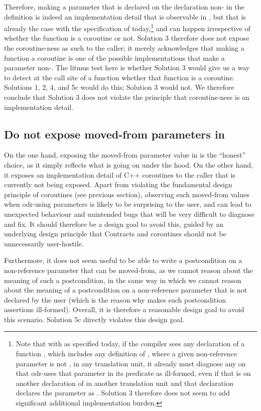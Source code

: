 Therefore, making a parameter that is declared  on the declaration non- in the definition is indeed an implementation detail that is observable in , but that is already the case with the specification of \cite{P2900R8} today,\footnote{Note that with \cite{P2900R8} as specified today, if the compiler sees any declaration of a function , which includes any definition of , where a given non-reference parameter is not , in any translation unit, it already must diagnose any  on  that odr-uses that parameter in its predicate as ill-formed, even if that  is on another declaration of  in another translation unit and that declaration declares the parameter as . Solution 3 therefore does not seem to add significant additional implementation burden.} and can happen irrespective of whether the function is a coroutine or not. Solution 3 therefore does not expose the coroutine-ness as such to the caller; it merely acknowledges that making a function a coroutine is one of the possible implementations that make a parameter non-. The litmus test here is whether Solution 3 would give us a way to detect at the call site of a function whether that function is a coroutine. Solutions 1, 2, 4, and 5c would do this; Solution 3 would not. We therefore conclude that Solution 3 does not violate the principle that coroutine-ness is an implementation detail.

\subsection{Do not expose moved-from parameters in }

On the one hand, exposing the moved-from parameter value in  is the ``honest'' choice, as it simply reflects what is going on under the hood. On the other hand, it exposes an implementation detail of C++ coroutines to the caller that is currently not being exposed. Apart from violating the fundamental design principle of coroutines (see previous section), observing such moved-from values when odr-using  parameters is likely to be surprising to the user, and can lead to unexpected behaviour and unintended bugs that will be very difficult to diagnose and fix. It should therefore be a design goal to avoid this, guided by an underlying design principle that Contracts and coroutines should not be unnecessarily user-hostile.

Furthermore, it does not seem useful to be able to write a postcondition on a non-reference parameter that can be moved-from, as we cannot reason about the meaning of such a postcondition, in the same way in which we cannot reason about the meaning of a postcondition on a non-reference parameter that is not declared  by the user (which is the reason why \cite{P2900R8} makes such postcondition assertions ill-formed). Overall, it is therefore a reasonable design goal to avoid this scenario. Solution 5c directly violates this design goal.
